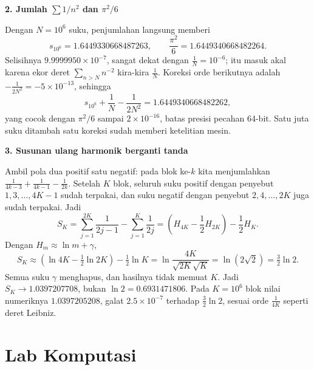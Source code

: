 \medskip\noindent\textbf{2. Jumlah $\sum 1/n^2$ dan $\pi^2/6$}

Dengan $N = 10^6$ suku, penjumlahan langsung memberi
\[
  s_{10^6} = 1.6449330668487263, \qquad \frac{\pi^2}{6} = 1.6449340668482264 .
\]
Selisihnya $9.9999950 \times 10^{-7}$, sangat dekat dengan $\frac{1}{N} = 10^{-6}$;
itu masuk akal karena ekor deret $\sum_{n>N} n^{-2}$ kira-kira $\frac{1}{N}$.
Koreksi orde berikutnya adalah $-\frac{1}{2N^2} = -5 \times 10^{-13}$, sehingga
\[
  s_{10^6} + \frac{1}{N} - \frac{1}{2N^2} = 1.6449340668482262,
\]
yang cocok dengan $\pi^2/6$ sampai $2 \times 10^{-16}$, batas presisi pecahan
64-bit. Satu juta suku ditambah satu koreksi sudah memberi ketelitian mesin.

\medskip\noindent\textbf{3. Susunan ulang harmonik berganti tanda}

Ambil pola dua positif satu negatif: pada blok ke-$k$ kita menjumlahkan
$\frac{1}{4k-3} + \frac{1}{4k-1} - \frac{1}{2k}$. Setelah $K$ blok, seluruh suku
positif dengan penyebut $1, 3, \ldots, 4K-1$ sudah terpakai, dan suku negatif dengan
penyebut $2, 4, \ldots, 2K$ juga sudah terpakai. Jadi
\[
  S_K = \sum_{j=1}^{2K} \frac{1}{2j-1} - \sum_{j=1}^{K} \frac{1}{2j}
      = \left( H_{4K} - \frac{1}{2}H_{2K} \right) - \frac{1}{2}H_K .
\]
Dengan $H_m \approx \ln m + \gamma$,
\[
  S_K \approx \left(\ln 4K - \tfrac{1}{2}\ln 2K\right) - \tfrac{1}{2}\ln K
  = \ln \frac{4K}{\sqrt{2K}\sqrt{K}} = \ln\left(2\sqrt{2}\right) = \tfrac{3}{2}\ln 2 .
\]
Semua suku $\gamma$ menghapus, dan hasilnya tidak memuat $K$. Jadi
$S_K \to 1.0397207708$, bukan $\ln 2 = 0.6931471806$. Pada $K = 10^6$ blok nilai
numeriknya $1.0397205208$, galat $2.5 \times 10^{-7}$ terhadap $\tfrac{3}{2}\ln 2$,
sesuai orde $\frac{1}{4K}$ seperti deret Leibniz.


\section{Lab Komputasi}

